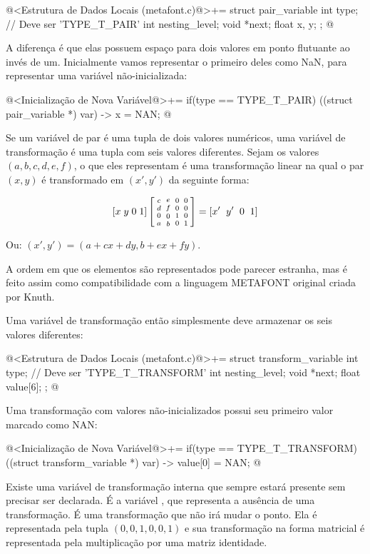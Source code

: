 \iniciocodigo
@<Estrutura de Dados Locais (metafont.c)@>+=
struct pair_variable{
  int type; // Deve ser 'TYPE_T_PAIR'
  int nesting_level;
  void *next;
  float x, y;
};
@
\fimcodigo

A diferença é que elas possuem espaço para dois valores em ponto
flutuante ao invés de um. Inicialmente vamos representar o primeiro
deles como NaN, para representar uma variável não-inicializada:

\iniciocodigo
@<Inicialização de Nova Variável@>+=
if(type == TYPE_T_PAIR){
  ((struct pair_variable *) var) -> x = NAN;
}
@
\fimcodigo


Se um variável de par é uma tupla de dois valores numéricos, uma
variável de transformação é uma tupla com seis valores
diferentes. Sejam os valores $(a, b, c, d, e, f)$, o que eles
representam é uma transformação linear na qual o par $(x, y)$ é
transformado em $(x', y')$ da seguinte forma:

$$\left[x\; y\; 0\; 1\right]\left[{{c \atop d}\atop
      {0\atop a}}{{e \atop f}\atop {0 \atop
      b}}{{0\atop 0}\atop{1 \atop 0}}{{0 \atop 0}\atop{0\atop
      1}}\right]=\left[x'\;\;
      y'\;\; 0\;\; 1\right]
$$

Ou: $(x', y') = (a+cx+dy, b+ex+fy)$.

A ordem em que os elementos são representados pode parecer estranha,
mas é feito assim como compatibilidade com a linguagem METAFONT
original criada por Knuth.

Uma variável de transformação então simplesmente deve armazenar os
seis valores diferentes:

\iniciocodigo
@<Estrutura de Dados Locais (metafont.c)@>+=
struct transform_variable{
  int type; // Deve ser 'TYPE_T_TRANSFORM'
  int nesting_level;
  void *next;
  float value[6];
};
@
\fimcodigo

Uma transformação com valores não-inicializados possui seu primeiro
valor marcado como NAN:

\iniciocodigo
@<Inicialização de Nova Variável@>+=
if(type == TYPE_T_TRANSFORM)
  ((struct transform_variable *) var) -> value[0] = NAN;
@
\fimcodigo

Existe uma variável de transformação interna que sempre estará
presente sem precisar ser declarada. É a
variável , que representa a ausência de uma
transformação. É uma transformação que não irá mudar o ponto. Ela é
representada pela tupla $(0, 0, 1, 0, 0, 1)$ e sua transformação na
forma matricial é representada pela multiplicação por uma matriz
identidade.

